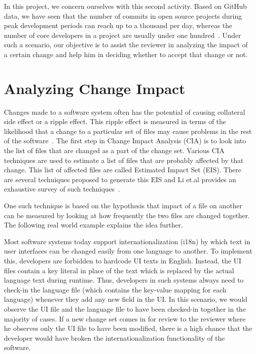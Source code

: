 In this project, we concern ourselves with this second activity. Based on GitHub data, we have seen that the number of commits in open source projects during peak development periods can reach up to a thousand per day, whereas the number of core developers in a project are usually under one hundred~\cite{YoshikawaIS14}. Under such a scenario, our objective is to assist the reviewer in analyzing the impact of a certain change and help him in deciding whether to accept that change or not.\\

\section{Analyzing Change Impact}

Changes made to a software system often has the potential of causing collateral side effect or a ripple effect. This ripple effect is measured in terms of the likelihood that a change to a particular set of files may cause problems in the rest of the software~\cite{STVSTVR1475}. The first step in Change Impact Analysis (CIA) is to look into the list of files that are changed as a part of the change set. Various CIA techniques are used to estimate a list of files that are probably affected by that change. This list of affected files are called Estimated Impact Set (EIS). There are several techniques proposed to generate this EIS and Li et.al provides an exhaustive survey of such techniques~\cite{STVSTVR1475}.

One such technique is based on the hypothesis that impact of a file on another can be measured by looking at how frequently the two files are changed together. The following real world example explains the idea further.

Most software systems today support internationalization (i18n) by which text in user interfaces can be changed easily from one language to another. To implement this, developers are forbidden to hardcode UI texts in English. Instead, the UI files contain a key literal in place of the text which is replaced by the actual language text during runtime. Thus, developers in such systems always need to check-in the language file (which contains the key-value mapping for each language) whenever they add any new field in the UI. In this scenario, we would observe the UI file and the language file to have been checked-in together in the majority of cases. If a new change set comes in for review to the reviewer where he observes only the UI file to have been modified, there is a high chance that the developer would have broken the internationalization functionality of the software.

